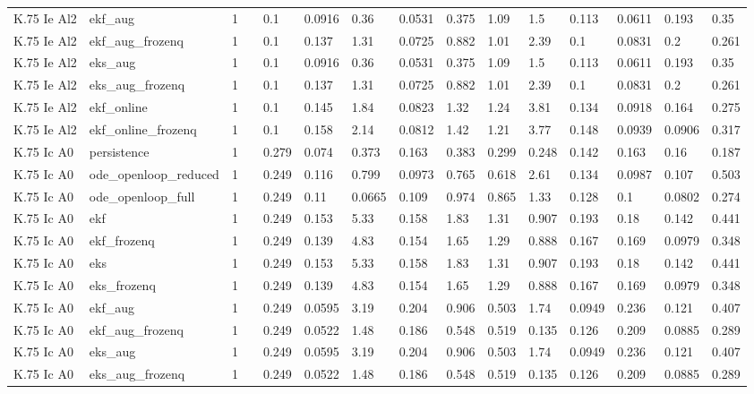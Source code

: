 \begin{table}[t]
\begin{tabular}{lllllllllllllll}
K.75 Ie Al2 & ekf\_aug & 1 &  & 0.1 & 0.0916 & 0.36 & 0.0531 & 0.375 & 1.09 & 1.5 & 0.113 & 0.0611 & 0.193 & 0.35 \\
K.75 Ie Al2 & ekf\_aug\_frozenq & 1 &  & 0.1 & 0.137 & 1.31 & 0.0725 & 0.882 & 1.01 & 2.39 & 0.1 & 0.0831 & 0.2 & 0.261 \\
K.75 Ie Al2 & eks\_aug & 1 &  & 0.1 & 0.0916 & 0.36 & 0.0531 & 0.375 & 1.09 & 1.5 & 0.113 & 0.0611 & 0.193 & 0.35 \\
K.75 Ie Al2 & eks\_aug\_frozenq & 1 &  & 0.1 & 0.137 & 1.31 & 0.0725 & 0.882 & 1.01 & 2.39 & 0.1 & 0.0831 & 0.2 & 0.261 \\
K.75 Ie Al2 & ekf\_online & 1 &  & 0.1 & 0.145 & 1.84 & 0.0823 & 1.32 & 1.24 & 3.81 & 0.134 & 0.0918 & 0.164 & 0.275 \\
K.75 Ie Al2 & ekf\_online\_frozenq & 1 &  & 0.1 & 0.158 & 2.14 & 0.0812 & 1.42 & 1.21 & 3.77 & 0.148 & 0.0939 & 0.0906 & 0.317 \\
K.75 Ic A0 & persistence & 1 &  & 0.279 & 0.074 & 0.373 & 0.163 & 0.383 & 0.299 & 0.248 & 0.142 & 0.163 & 0.16 & 0.187 \\
K.75 Ic A0 & ode\_openloop\_reduced & 1 &  & 0.249 & 0.116 & 0.799 & 0.0973 & 0.765 & 0.618 & 2.61 & 0.134 & 0.0987 & 0.107 & 0.503 \\
K.75 Ic A0 & ode\_openloop\_full & 1 &  & 0.249 & 0.11 & 0.0665 & 0.109 & 0.974 & 0.865 & 1.33 & 0.128 & 0.1 & 0.0802 & 0.274 \\
K.75 Ic A0 & ekf & 1 &  & 0.249 & 0.153 & 5.33 & 0.158 & 1.83 & 1.31 & 0.907 & 0.193 & 0.18 & 0.142 & 0.441 \\
K.75 Ic A0 & ekf\_frozenq & 1 &  & 0.249 & 0.139 & 4.83 & 0.154 & 1.65 & 1.29 & 0.888 & 0.167 & 0.169 & 0.0979 & 0.348 \\
K.75 Ic A0 & eks & 1 &  & 0.249 & 0.153 & 5.33 & 0.158 & 1.83 & 1.31 & 0.907 & 0.193 & 0.18 & 0.142 & 0.441 \\
K.75 Ic A0 & eks\_frozenq & 1 &  & 0.249 & 0.139 & 4.83 & 0.154 & 1.65 & 1.29 & 0.888 & 0.167 & 0.169 & 0.0979 & 0.348 \\
K.75 Ic A0 & ekf\_aug & 1 &  & 0.249 & 0.0595 & 3.19 & 0.204 & 0.906 & 0.503 & 1.74 & 0.0949 & 0.236 & 0.121 & 0.407 \\
K.75 Ic A0 & ekf\_aug\_frozenq & 1 &  & 0.249 & 0.0522 & 1.48 & 0.186 & 0.548 & 0.519 & 0.135 & 0.126 & 0.209 & 0.0885 & 0.289 \\
K.75 Ic A0 & eks\_aug & 1 &  & 0.249 & 0.0595 & 3.19 & 0.204 & 0.906 & 0.503 & 1.74 & 0.0949 & 0.236 & 0.121 & 0.407 \\
K.75 Ic A0 & eks\_aug\_frozenq & 1 &  & 0.249 & 0.0522 & 1.48 & 0.186 & 0.548 & 0.519 & 0.135 & 0.126 & 0.209 & 0.0885 & 0.289 \\

\end{tabular}
\end{table}
